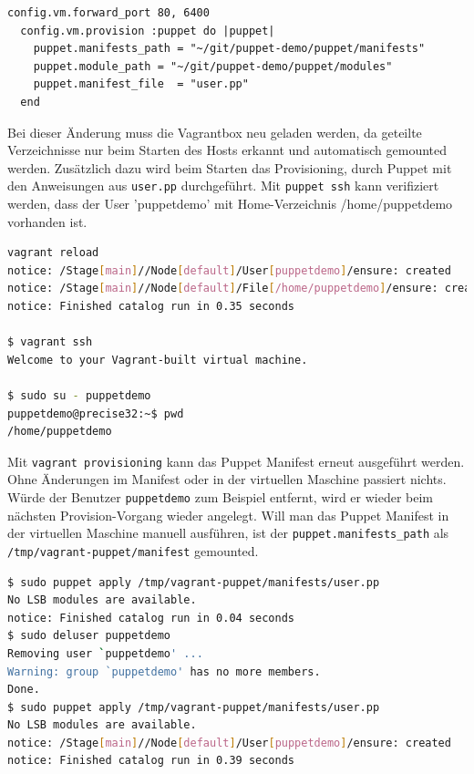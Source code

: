 \documentclass[12pt,a4paper,ngerman]{article}
\begin{document}
\begin{lstlisting}[language=vagrant,caption=Puppet Provisioning in Vagrantfile konfigurieren, label=vagrantprovisioning]
  config.vm.forward_port 80, 6400  
  config.vm.provision :puppet do |puppet|
    puppet.manifests_path = "~/git/puppet-demo/puppet/manifests"
    puppet.module_path = "~/git/puppet-demo/puppet/modules"
    puppet.manifest_file  = "user.pp"
  end
\end{lstlisting} 

Bei dieser Änderung muss die Vagrantbox neu geladen werden, da geteilte Verzeichnisse nur beim Starten des Hosts erkannt und automatisch gemounted werden. Zusätzlich dazu wird beim Starten das Provisioning, durch Puppet mit den Anweisungen aus \lstinline$user.pp$ durchgeführt. Mit \lstinline$puppet ssh$ kann verifiziert werden, dass der User 'puppetdemo' mit Home-Verzeichnis /home/puppetdemo vorhanden ist.

\begin{lstlisting}[language=sh,caption=Vagrant Box neu laden, label=vagrant-reload]
vagrant reload
notice: /Stage[main]//Node[default]/User[puppetdemo]/ensure: created
notice: /Stage[main]//Node[default]/File[/home/puppetdemo]/ensure: created
notice: Finished catalog run in 0.35 seconds

$ vagrant ssh
Welcome to your Vagrant-built virtual machine.

$ sudo su - puppetdemo
puppetdemo@precise32:~$ pwd
/home/puppetdemo
\end{lstlisting}

Mit \lstinline$vagrant provisioning$ kann das Puppet Manifest erneut ausgeführt werden. Ohne Änderungen im Manifest oder in der virtuellen Maschine passiert nichts. Würde der Benutzer \lstinline$puppetdemo$ zum Beispiel entfernt, wird er wieder beim nächsten Provision-Vorgang wieder angelegt.
Will man das Puppet Manifest in der virtuellen Maschine manuell ausführen, ist der \lstinline$puppet.manifests_path$ als \lstinline$/tmp/vagrant-puppet/manifest$ gemounted.

\begin{lstlisting}[language=sh,caption=Puppet apply im Box, label=vagrant-apply]
$ sudo puppet apply /tmp/vagrant-puppet/manifests/user.pp
No LSB modules are available.
notice: Finished catalog run in 0.04 seconds
$ sudo deluser puppetdemo
Removing user `puppetdemo' ...
Warning: group `puppetdemo' has no more members.
Done.
$ sudo puppet apply /tmp/vagrant-puppet/manifests/user.pp
No LSB modules are available.
notice: /Stage[main]//Node[default]/User[puppetdemo]/ensure: created
notice: Finished catalog run in 0.39 seconds
\end{lstlisting}
\end{document}
